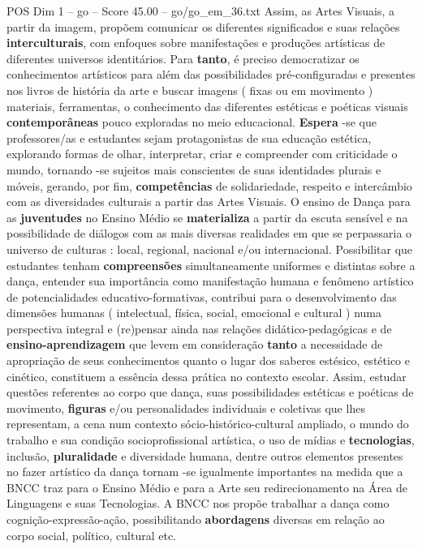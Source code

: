 \begin{textsample}{POS Dim 1 – go – Score 45.00 – go/go\_em\_36.txt}
Assim, as Artes Visuais, a partir da imagem, propõem comunicar os diferentes significados e suas relações \textbf{interculturais}, com enfoques sobre manifestações e produções artísticas de diferentes universos identitários.
Para \textbf{tanto}, é preciso democratizar os conhecimentos artísticos para além das possibilidades pré-configuradas e presentes nos livros de história da arte e buscar imagens ( fixas ou em movimento ) materiais, ferramentas, o conhecimento das diferentes estéticas e poéticas visuais \textbf{contemporâneas} pouco exploradas no meio educacional. \textbf{Espera} -se que professores/as e estudantes sejam protagonistas de sua educação estética, explorando formas de olhar, interpretar, criar e compreender com criticidade o mundo, tornando -se sujeitos mais conscientes de suas identidades plurais e móveis, gerando, por fim, \textbf{competências} de solidariedade, respeito e intercâmbio com as diversidades culturais a partir das Artes Visuais.
O ensino de Dança para as \textbf{juventudes} no Ensino Médio se \textbf{materializa} a partir da escuta sensível e na possibilidade de diálogos com as mais diversas realidades em que se perpassaria o universo de culturas : local, regional, nacional e/ou internacional.
Possibilitar que estudantes tenham \textbf{compreensões} simultaneamente uniformes e distintas sobre a dança, entender sua importância como manifestação humana e fenômeno artístico de potencialidades educativo-formativas, contribui para o desenvolvimento das dimensões humanas ( intelectual, física, social, emocional e cultural ) numa perspectiva integral e (re)pensar ainda nas relações didático-pedagógicas e de \textbf{ensino-aprendizagem} que levem em consideração \textbf{tanto} a necessidade de apropriação de seus conhecimentos quanto o lugar dos saberes estésico, estético e cinético, constituem a essência dessa prática no contexto escolar.
Assim, estudar questões referentes ao corpo que dança, suas possibilidades estéticas e poéticas de movimento, \textbf{figuras} e/ou personalidades individuais e coletivas que lhes representam, a cena num contexto sócio-histórico-cultural ampliado, o mundo do trabalho e sua condição socioprofissional artística, o uso de mídias e \textbf{tecnologias}, inclusão, \textbf{pluralidade} e diversidade humana, dentre outros elementos presentes no fazer artístico da dança tornam -se igualmente importantes na medida que a BNCC traz para o Ensino Médio e para a Arte seu redirecionamento na Área de Linguagens e suas Tecnologias.
A BNCC nos propõe trabalhar a dança como cognição-expressão-ação, possibilitando \textbf{abordagens} diversas em relação ao corpo social, político, cultural etc.

\end{textsample}
